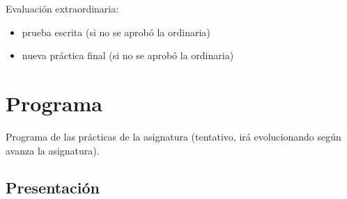 \documentclass[a4paper,12pt]{report}
\begin{document}
Evaluación extraordinaria:

\begin{itemize}
\item prueba escrita (si no se aprobó la ordinaria)
\item nueva práctica final (si no se aprobó la ordinaria)
\end{itemize}






\chapter{Programa}

Programa de las prácticas de la asignatura (tentativo, irá evolucionando según avanza la asignatura).

\section{Presentación}

\end{document}
